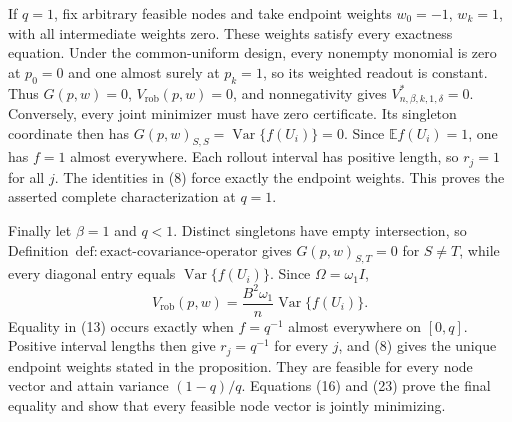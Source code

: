 If \(q=1\), fix arbitrary feasible nodes and take endpoint weights \(w_0=-1\), \(w_k=1\), with all intermediate weights zero.  These weights satisfy every exactness equation.  Under the common-uniform design, every nonempty monomial is zero at \(p_0=0\) and one almost surely at \(p_k=1\), so its weighted readout is constant.  Thus \(G(p,w)=0\), \(V_{\mathrm{rob}}(p,w)=0\), and nonnegativity gives \(V^*_{n,\beta,k,1,\delta}=0\).  Conversely, every joint minimizer must have zero certificate.  Its singleton coordinate then has \(G(p,w)_{S,S}=\operatorname{Var}\{f(U_i)\}=0\).  Since \(\mathbb E f(U_i)=1\), one has \(f=1\) almost everywhere.  Each rollout interval has positive length, so \(r_j=1\) for all \(j\).  The identities in (8) force exactly the endpoint weights.  This proves the asserted complete characterization at \(q=1\).

Finally let \(\beta=1\) and \(q<1\).  Distinct singletons have empty intersection, so Definition~\(\mathrm{def{:}exact\text{-}covariance\text{-}operator}\) gives \(G(p,w)_{S,T}=0\) for \(S\ne T\), while every diagonal entry equals \(\operatorname{Var}\{f(U_i)\}\).  Since \(\Omega=\omega_1I\),
\[
V_{\mathrm{rob}}(p,w)
=\frac{B^2\omega_1}{n}\operatorname{Var}\{f(U_i)\}.
\tag{23}
\]
Equality in (13) occurs exactly when \(f=q^{-1}\) almost everywhere on \([0,q]\).  Positive interval lengths then give \(r_j=q^{-1}\) for every \(j\), and (8) gives the unique endpoint weights stated in the proposition.  They are feasible for every node vector and attain variance \((1-q)/q\).  Equations (16) and (23) prove the final equality and show that every feasible node vector is jointly minimizing.